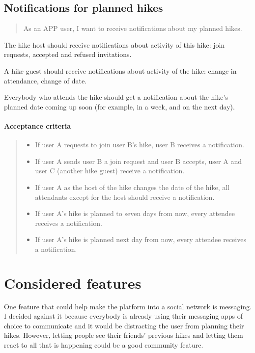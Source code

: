 \subsection{Notifications for planned hikes}\label{US:notif-plans}
\begin{quote}
As an APP user, I want to receive notifications about my planned hikes.
\end{quote}

The hike host should receive notifications about activity of this hike: join requests, accepted and refused invitations.

A hike guest should receive notifications about activity of the hike: change in attendance, change of date.

Everybody who attends the hike should get a notification about the hike's planned date coming up soon (for example, in a week, and on the next day).

\paragraph*{Acceptance criteria}
\begin{quote}
\begin{itemize}
    \item If user A requests to join user B's hike, user B receives a notification.
    \item If user A sends user B a join request and user B accepts, user A and user C (another hike guest) receive a notification.
    \item If user A as the host of the hike changes the date of the hike, all attendants except for the host should receive a notification.
    \item If user A's hike is planned to seven days from now, every attendee receives a notification.
    \item If user A's hike is planned next day from now, every attendee receives a notification.
\end{itemize}
\end{quote}


\section{Considered features}
One feature that could help make the platform into a social network is messaging.
I decided against it because everybody is already using their messaging apps of choice to communicate and it would be distracting the user from planning their hikes.
However, letting people see their friends' previous hikes and letting them react to all that is happening could be a good community feature.

